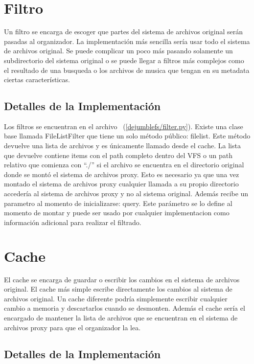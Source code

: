 \section{Filtro}

Un filtro se encarga de escoger que partes del sistema de archivos original serán pasadas al organizador. La implementación más sencilla sería usar todo el sistema de archivos original. Se puede complicar un poco más pasando solamente un subdirectorio del sistema original o se puede llegar a filtros más complejos como el resultado de una busqueda o los archivos de musica que tengan en su metadata ciertas características.

\subsection{Detalles de la Implementación}

Los filtros se encuentran en el archivo ~(\ref{dejumblefs/filter.py}). Existe una clase base llamada FileListFilter que tiene un solo método público: filelist. Este método devuelve una lista de archivos y es únicamente llamado desde el cache. La lista que devuelve contiene items con el path completo dentro del VFS o un path relativo que comienza con ``./'' si el archivo se encuentra en el directorio original donde se montó el sistema de archivos proxy. Esto es necesario ya que una vez montado el sistema de archivos proxy cualquier llamada a su propio directorio accedería al sistema de archivos proxy y no al sistema original. Además recibe un parametro al momento de inicializarse: query. Este parámetro se lo define al momento de montar y puede ser usado por cualquier implementacion como información adicional para realizar el filtrado.


\section{Cache}

El cache se encarga de guardar o escribir los cambios en el sistema de archivos original. El cache más simple escribe directamente los cambios al sistema de archivos original. Un cache diferente podría simplemente escribir cualquier cambio a memoria y descartarlos cuando se desmonten. Además el cache sería el encargado de mantener la lista de archivos que se encuentran en el sistema de archivos proxy para que el organizador la lea.

\subsection{Detalles de la Implementación}

